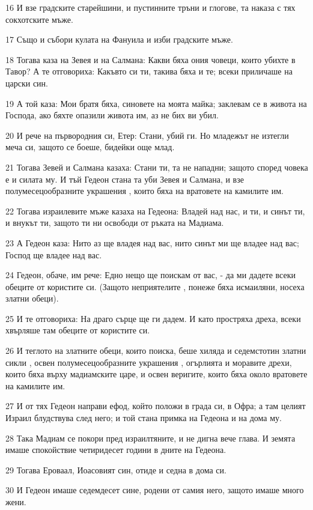 \par 16 И взе градските старейшини, и пустинните тръни и глогове, та наказа с тях сокхотските мъже.
\par 17 Също и събори кулата на Фануила и изби градските мъже.
\par 18 Тогава каза на Зевея и на Салмана: Какви бяха ония човеци, които убихте в Тавор? А те отговориха: Какъвто си ти, такива бяха и те; всеки приличаше на царски син.
\par 19 А той каза: Мои братя бяха, синовете на моята майка; заклевам се в живота на Господа, ако бяхте опазили живота им, аз не бих ви убил.
\par 20 И рече на първородния си, Етер: Стани, убий ги. Но младежът не изтегли меча си, защото се боеше, бидейки още млад.
\par 21 Тогава Зевей и Салмана казаха: Стани ти, та не нападни; защото според човека е и силата му. И тъй Гедеон стана та уби Зевея и Салмана, и взе полумесецообразните украшения , които бяха на вратовете на камилите им.
\par 22 Тогава израилевите мъже казаха на Гедеона: Владей над нас, и ти, и синът ти, и внукът ти, защото ти ни освободи от ръката на Мадиама.
\par 23 А Гедеон каза: Нито аз ще владея над вас, нито синът ми ще владее над вас; Господ ще владее над вас.
\par 24 Гедеон, обаче, им рече: Едно нещо ще поискам от вас, - да ми дадете всеки обеците от користите си. (Защото неприятелите , понеже бяха исмаиляни, носеха златни обеци).
\par 25 И те отговориха: На драго сърце ще ги дадем. И като простряха дреха, всеки хвърляше там обеците от користите си.
\par 26 И теглото на златните обеци, които поиска, беше хиляда и седемстотин златни сикли , освен полумесецообразните украшения , огърлията и моравите дрехи, които бяха върху мадиамските царе, и освен веригите, които бяха около вратовете на камилите им.
\par 27 И от тях Гедеон направи ефод, който положи в града си, в Офра; а там целият Израил блудствува след него; и той стана примка на Гедеона и на дома му.
\par 28 Така Мадиам се покори пред израилтяните, и не дигна вече глава. И земята имаше спокойствие четиридесет години в дните на Гедеона.
\par 29 Тогава Ероваал, Иоасовият син, отиде и седна в дома си.
\par 30 И Гедеон имаше седемдесет сине, родени от самия него, защото имаше много жени.
